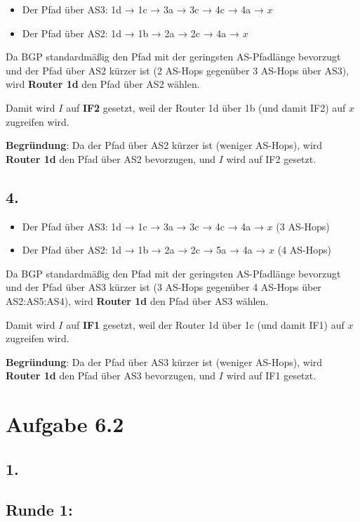 \documentclass[a4paper]{scrartcl}
\begin{document}
\begin{itemize}
    \item Der Pfad über AS3: 1d → 1c → 3a → 3c → 4c → 4a → \( x \)
    \item Der Pfad über AS2: 1d → 1b → 2a → 2c → 4a → \( x \)
\end{itemize}

Da BGP standardmäßig den Pfad mit der geringsten AS-Pfadlänge bevorzugt und der Pfad über AS2 kürzer ist (2 AS-Hops gegenüber 3 AS-Hops über AS3), wird \textbf{Router 1d} den Pfad über AS2 wählen.

Damit wird \( I \) auf \textbf{IF2} gesetzt, weil der Router 1d über 1b (und damit IF2) auf \( x \) zugreifen wird.

\textbf{Begründung}: Da der Pfad über AS2 kürzer ist (weniger AS-Hops), wird \textbf{Router 1d} den Pfad über AS2 bevorzugen, und \( I \) wird auf IF2 gesetzt.

\subsection*{4.}
\begin{itemize}
  \item Der Pfad über AS3: 1d → 1c → 3a → 3c → 4c → 4a → \( x \) (3 AS-Hops)
  \item Der Pfad über AS2: 1d → 1b → 2a → 2c → 5a → 4a → \( x \) (4 AS-Hops)
\end{itemize}

Da BGP standardmäßig den Pfad mit der geringsten AS-Pfadlänge bevorzugt und der Pfad über AS3 kürzer ist (3 AS-Hops gegenüber 4 AS-Hops über AS2:AS5:AS4), wird \textbf{Router 1d} den Pfad über AS3 wählen.

Damit wird \( I \) auf \textbf{IF1} gesetzt, weil der Router 1d über 1c (und damit IF1) auf \( x \) zugreifen wird.

\textbf{Begründung}: Da der Pfad über AS3 kürzer ist (weniger AS-Hops), wird \textbf{Router 1d} den Pfad über AS3 bevorzugen, und \( I \) wird auf IF1 gesetzt.

\section*{Aufgabe 6.2}
\subsection*{1.}
\subsection*{Runde 1:}
\end{document}

